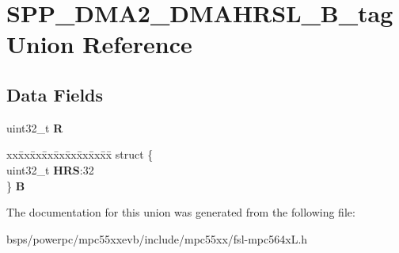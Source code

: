 \hypertarget{unionSPP__DMA2__DMAHRSL__32B__tag}{}\section{S\+P\+P\+\_\+\+D\+M\+A2\+\_\+\+D\+M\+A\+H\+R\+S\+L\+\_\+B\+\_\+tag Union Reference}
\label{unionSPP__DMA2__DMAHRSL__32B__tag}
\subsection*{Data Fields}
\begin{DoxyCompactItemize}
\item 
\mbox{\label{unionSPP__DMA2__DMAHRSL__32B__tag_acc8ca40341280eef029ee3624fa51543}} 
uint32\+\_\+t {\bfseries R}
\item 
\mbox{\label{unionSPP__DMA2__DMAHRSL__32B__tag_a7bc28cf265f379bff23c408a32570bda}} 
\begin{tabbing}
xx\=xx\=xx\=xx\=xx\=xx\=xx\=xx\=xx\=\kill
struct \{\\
\>uint32\_t {\bfseries HRS}:32\\
\} {\bfseries B}\\

\end{tabbing}\end{DoxyCompactItemize}


The documentation for this union was generated from the following file\+:\begin{DoxyCompactItemize}
\item 
bsps/powerpc/mpc55xxevb/include/mpc55xx/fsl-\/mpc564x\+L.\+h\end{DoxyCompactItemize}
